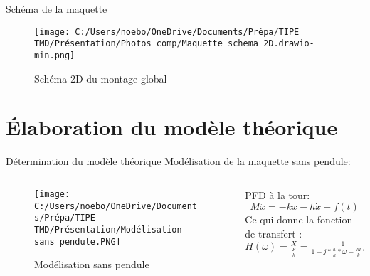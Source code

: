 \documentclass{beamer}
\begin{document}
\begin{frame}{Schéma de la maquette}
	\begin{figure}
		\texttt{[image: C:/Users/noebo/OneDrive/Documents/Prépa/TIPE TMD/Présentation/Photos comp/Maquette schema 2D.drawio-min.png]}
		\caption{Schéma 2D du montage global}
	\end{figure}
\end{frame}
	
\section{Élaboration du modèle théorique}

\begin{frame}{Détermination du modèle théorique}
 Modélisation de la maquette sans pendule:\vspace{12 pt}
	\begin{columns}
		\begin{column}{0.5\textwidth}
			\begin{figure}
				\texttt{[image: C:/Users/noebo/OneDrive/Documents/Prépa/TIPE TMD/Présentation/Modélisation sans pendule.PNG]}
				\caption{Modélisation sans pendule}
			\end{figure}
		\end{column}
		\begin{column}{0.6\textwidth}
			PFD à la tour:
			\begin{equation*}
				M\ddot{x} = -kx -h\dot{x} + f(t)
			\end{equation*}
			Ce qui donne la fonction de transfert : 
			$H(\omega)=\frac{X}{\frac{F}{k}}=\frac{1}{1+j*\frac{h}{k}*\omega-\frac{M}{k}*\omega^{2}}$
		\end{column}
	\end{columns}
\end{frame}	
\end{document}
